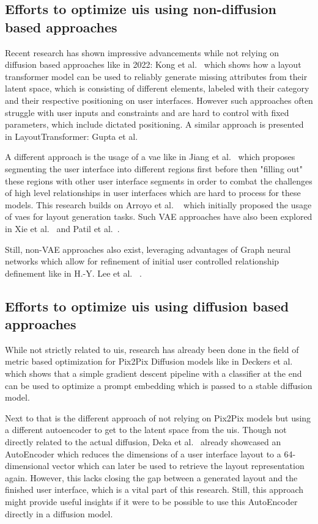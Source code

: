 \documentclass[10pt,a4paper]{scrartcl} %
\begin{document}
\subsection{Efforts to optimize \ac{uis} using non-diffusion based approaches}
Recent research has shown impressive advancements while not relying on diffusion based approaches like in 2022: Kong et al.~\cite{kong2022blt}
which shows how a layout transformer model can be used to reliably generate missing attributes from their latent space, which is
consisting of different elements, labeled with their category and their respective positioning on user interfaces.
However such approaches often struggle with user inputs and constraints and are hard to control with fixed parameters, which include
dictated positioning. A similar approach is presented in LayoutTransformer: Gupta et al.~\cite{gupta2021layouttransformer}

A different approach is the usage of a \ac{vae} like in Jiang et al.~\cite{Jiang_Sun_Zhu_Lou_Zhang_2022} which proposes segmenting
the user interface into different regions first before then "filling out" these regions with other user interface segments in
order to combat the challenges of high level relationships in user interfaces which are hard to process for these models.
This research builds on Arroyo et al. ~\cite{arroyo2021variational} which initially proposed the usage of \ac{vae}s for layout 
generation tasks. Such VAE approaches have also been explored in Xie et al.~\cite{xie2021canvasemb} and Patil et al.~\cite{patil2020read}.

Still, non-VAE approaches also exist, leveraging advantages of Graph neural networks which allow for refinement of initial user
controlled relationship definement like in  H.-Y. Lee et al. ~\cite{lee2020neural}.
 
\subsection{Efforts to optimize \ac{uis} using diffusion based approaches}
While not strictly related to \ac{uis}, research has already been done in the field of metric based optimization for Pix2Pix
Diffusion models like in Deckers et al. \cite{deckers2023manipulating} which shows that a simple gradient descent pipeline with a
classifier at the end can be used to optimize a prompt embedding which is passed to a stable diffusion model.

Next to that is the different approach of not relying on Pix2Pix models but using a different autoencoder to get to the latent 
space from the \ac{uis}. Though not directly related to the actual diffusion, Deka et al.~\cite{10.1145/3126594.3126651} already
showcased an AutoEncoder which reduces the dimensions of a user interface layout to a 64-dimensional vector which can later
be used to retrieve the layout representation again. However, this lacks closing the gap between a generated layout and the
finished user interface, which is a vital part of this research. Still, this approach might provide useful insights if
it were to be possible to use this AutoEncoder directly in a diffusion model.
\end{document}
